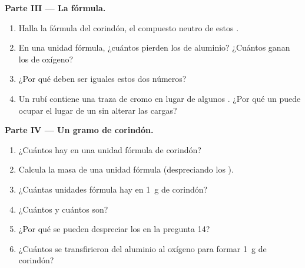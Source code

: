 \begin{problem}
\medskip
\noindent\textbf{Parte III --- La fórmula.}
\begin{enumerate}[resume]
  \item Halla la fórmula del corindón, el compuesto neutro de estos
        .
  \item En una unidad fórmula, ¿cuántos  pierden los  de
        aluminio? ¿Cuántos ganan los  de oxígeno?
  \item ¿Por qué deben ser iguales estos dos números?
  \item Un rubí contiene una traza de  cromo  en lugar
        de algunos . ¿Por qué un   puede
        ocupar el lugar de un   sin alterar las cargas?
\end{enumerate}

\medskip
\noindent\textbf{Parte IV --- Un gramo de corindón.}
\begin{enumerate}[resume]
  \item ¿Cuántos  hay en una unidad fórmula de corindón?
  \item Calcula la masa de una unidad fórmula (despreciando los
        ).
  \item ¿Cuántas unidades fórmula hay en \qty{1}{g} de corindón?
  \item ¿Cuántos   y cuántos   son?
  \item ¿Por qué se pueden despreciar los  en la pregunta 14?
  \item ¿Cuántos  se transfirieron del aluminio al oxígeno para
        formar \qty{1}{g} de corindón?
\end{enumerate}
\end{problem}
